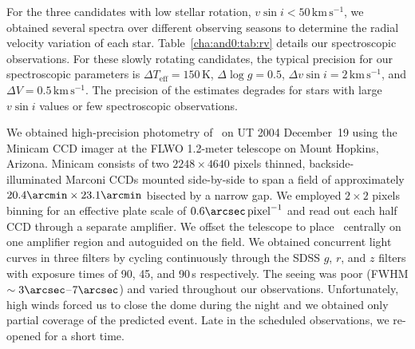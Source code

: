 For the three candidates with low stellar rotation, $v\sin{i} < 50\,\mathrm{km\,s^{-1}}$, we obtained several spectra over different observing seasons to determine the radial velocity variation of each star. Table~\ref{cha:and0:tab:rv} details our spectroscopic observations. For these slowly rotating candidates, the typical precision for our spectroscopic parameters is $\Delta T_{\mathrm{eff}} = 150\,\mathrm{K}$, $\Delta \log{g} = 0.5$, $\Delta v \sin{i} = 2\,\mathrm{km\,s^{-1}}$, and $\Delta V = 0.5\,\mathrm{km\,s^{-1}}$. The precision of the estimates degrades for stars with large $v\sin{i}$ values or few spectroscopic observations.

We obtained high-precision photometry of \tFive\ on UT 2004 December~19 using the Minicam CCD imager at the FLWO 1.2-meter telescope on
Mount Hopkins, Arizona.  Minicam consists of two $2248\times 4640$ pixels
thinned, backside-illuminated Marconi CCDs mounted side-by-side to
span a field of approximately $20.4\arcmin \times 23.1 \arcmin$ bisected by
a narrow gap.  We employed $2 \times 2$ pixels binning for an effective
plate scale of $0.6\arcsec\,\mathrm{pixel}^{-1}$ and read out each half CCD
through a separate amplifier.  We offset the telescope to place
\tFive\ centrally on one amplifier region and autoguided on the
field.  We obtained concurrent light curves in three filters by cycling
continuously through the SDSS $g$, $r$, and $z$ filters with exposure times
of 90, 45, and 90\,s respectively.  The seeing was poor
(FWHM $\sim3\arcsec$--$7\arcsec$) and varied throughout our observations.
Unfortunately, high winds forced us to close the dome during the night
and we obtained only partial coverage of the predicted event.  Late in
the scheduled observations, we re-opened for a short time.

